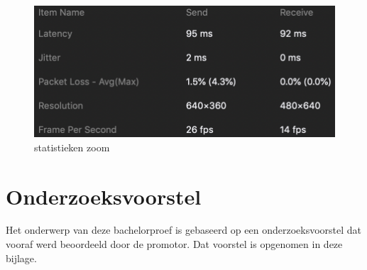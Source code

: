 \documentclass{bachproef-tin}
\begin{document}
\begin{figure}[H]
	\centering
	\includegraphics[width=120mm]{./img/statsZoom}		
	\caption{statistieken zoom}
\end{figure}




\chapter{Onderzoeksvoorstel}

Het onderwerp van deze bachelorproef is gebaseerd op een onderzoeksvoorstel dat vooraf werd beoordeeld door de promotor. Dat voorstel is opgenomen in deze bijlage.





\printbibliography[heading=bibintoc]
\end{document}
